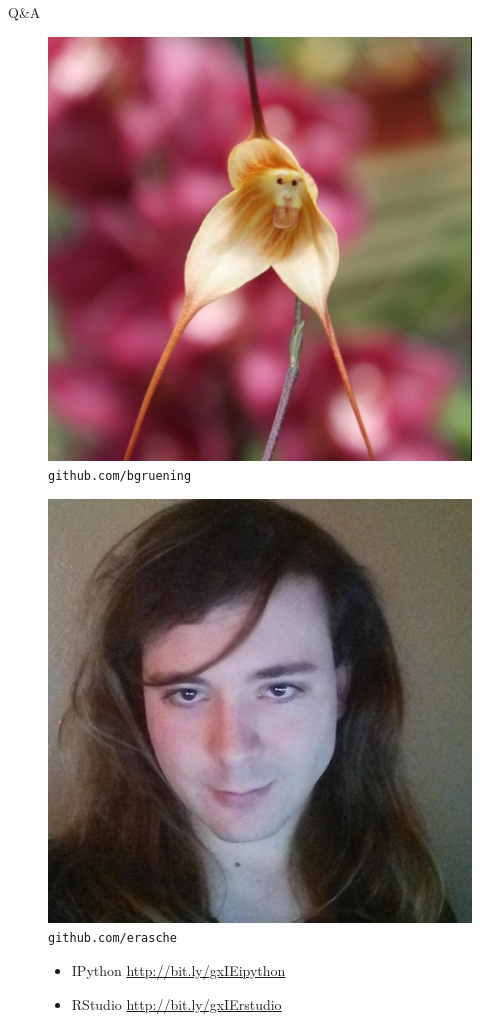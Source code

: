 \documentclass[12pt]{beamer} %
\begin{document}
\begin{frame}{Q\&A}

\begin{figure}
\centering
\begin{minipage}{.5\textwidth}
  \centering
  \includegraphics[width=.8\textwidth]{bgruening.png}\\
  \texttt{github.com/bgruening}
\end{minipage}%
\begin{minipage}{.5\textwidth}
  \centering
  \includegraphics[width=.8\textwidth]{erasche.png}\\
  \texttt{github.com/erasche}
\end{minipage}
\begin{itemize}
	\item IPython \url{http://bit.ly/gxIEipython}
    \item RStudio \url{http://bit.ly/gxIErstudio}
\end{itemize}

\end{figure}


\end{frame}
\end{document}

